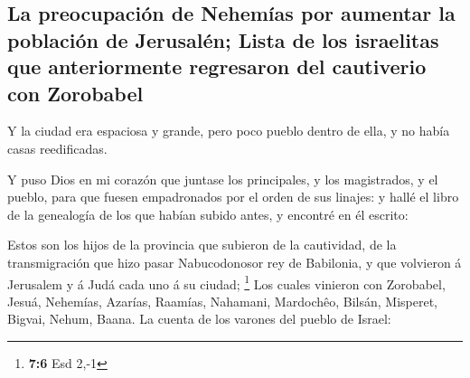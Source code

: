 \hypertarget{la-preocupaciuxf3n-de-nehemuxedas-por-aumentar-la-poblaciuxf3n-de-jerusaluxe9n-lista-de-los-israelitas-que-anteriormente-regresaron-del-cautiverio-con-zorobabel}{%
\subsection{La preocupación de Nehemías por aumentar la población de
Jerusalén; Lista de los israelitas que anteriormente regresaron del
cautiverio con
Zorobabel}\label{la-preocupaciuxf3n-de-nehemuxedas-por-aumentar-la-poblaciuxf3n-de-jerusaluxe9n-lista-de-los-israelitas-que-anteriormente-regresaron-del-cautiverio-con-zorobabel}}

 Y la ciudad era espaciosa y grande, pero poco pueblo dentro
de ella, y no había casas reedificadas.

 Y puso Dios en mi corazón que juntase los principales, y
los magistrados, y el pueblo, para que fuesen empadronados por el orden
de sus linajes: y hallé el libro de la genealogía de los que habían
subido antes, y encontré en él escrito:

 Estos son los hijos de la provincia que subieron de la
cautividad, de la transmigración que hizo pasar Nabucodonosor rey de
Babilonia, y que volvieron á Jerusalem y á Judá cada uno á su ciudad;
\footnote{\textbf{7:6} Esd 2,-1}  Los cuales vinieron con
Zorobabel, Jesuá, Nehemías, Azarías, Raamías, Nahamani, Mardochêo,
Bilsán, Misperet, Bigvai, Nehum, Baana. La cuenta de los varones del
pueblo de Israel:

